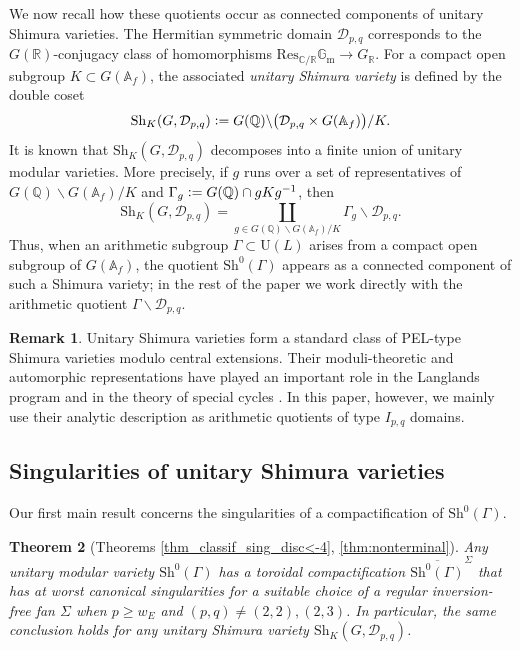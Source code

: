 \documentclass[11pt]{amsart}
\theoremstyle{plain}
\newtheorem{thm}{Theorem}[section]
\theoremstyle{definition}
\newtheorem{rem}[thm]{Remark}
\numberwithin{equation}{section}
\def\U{\mathrm{U}}
\newcommand{\bbA}{\mathbb{A}}
\newcommand{\bbC}{\mathbb{C}}
\newcommand{\bbQ}{\mathbb{Q}}
\newcommand{\bbR}{\mathbb{R}}
\newcommand{\defeq}{\vcentcolon=}
\begin{document}
We now recall how these quotients occur as connected components of unitary Shimura varieties. The Hermitian symmetric domain $\mathcal{D}_{p,q}$ corresponds to the $G(\bbR)$-conjugacy class of homomorphisms $\mathrm{Res}_{\bbC/\bbR}\mathbb{G}_{\mathrm{m}}\to G_{\bbR}$. For a compact open subgroup $K\subset G(\mathbb{A}_f)$, the associated \emph{unitary Shimura variety} is defined by the double coset
\[
  \mathrm{Sh}_{K}(G,\mathcal{D}_{p,q})\defeq G(\bbQ)\backslash\bigl(\mathcal{D}_{p,q}\times G(\mathbb{A}_f)\bigr)/K.
\]
It is known that $\mathrm{Sh}_{K}(G,\mathcal{D}_{p,q})$ decomposes into a finite union of unitary modular varieties. More precisely, if $g$ runs over a set of representatives of $G(\bbQ)\backslash G(\mathbb{A}_f)/K$ and  
  $\Gamma_g \defeq G(\bbQ) \cap gKg^{-1}$,
then
\[
  \mathrm{Sh}_{K}(G,\mathcal{D}_{p,q}) = \coprod_{g\in G(\bbQ)\backslash G(\mathbb{A}_f)/K} \Gamma_g\backslash \mathcal{D}_{p,q}.
\]
Thus, when an arithmetic subgroup $\Gamma\subset \U(L)$ arises from a compact open subgroup of $G(\bbA_f)$, the quotient $\mathrm{Sh}^0(\Gamma)$ appears as a connected component of such a Shimura variety; in the rest of the paper we work directly with the arithmetic quotient $\Gamma\backslash\mathcal{D}_{p,q}$.

\begin{rem}
Unitary Shimura varieties form a standard class of PEL-type Shimura varieties modulo central extensions. Their moduli-theoretic and automorphic representations have played an important role in the Langlands program and in the theory of special cycles \cites{Kottwitz1992points,harris2000geometry,shin2011galois,caraiani2017generic,kudla2011special}. In this paper, however, we mainly use their analytic description as arithmetic quotients of type $I_{p,q}$ domains.
\end{rem}

\subsection{Singularities of unitary Shimura varieties}
Our first main result concerns the singularities of a compactification of $\mathrm{Sh}^0(\Gamma)$.
\begin{thm}[{Theorems \ref{thm_classif_sing_disc<-4}, \ref{thm:nonterminal}}]
\label{mainthm:singularity}
  Any unitary modular variety $\mathrm{Sh}^0(\Gamma)$ has a toroidal compactification $\overline{\mathrm{Sh}^0(\Gamma)}^{\Sigma}$ that has at worst canonical singularities for a suitable choice of a regular inversion-free fan $\Sigma$ when $p \geq w_E$ and $(p,q) \neq (2,2),(2,3)$.
  In particular, the same conclusion holds for any unitary Shimura variety $\mathrm{Sh}_{K}(G,\mathcal{D}_{p,q})$.
\end{thm}
\end{document}
